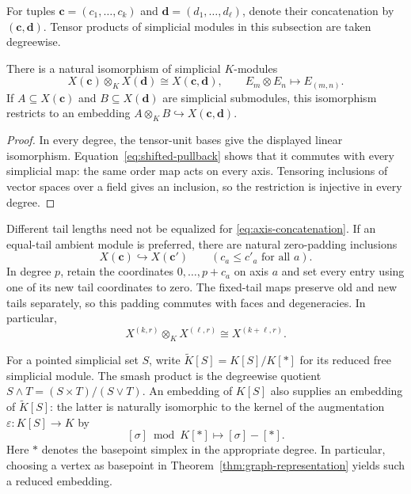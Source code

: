 For tuples $\mathbf c=(c_1,\ldots,c_k)$ and
$\mathbf d=(d_1,\ldots,d_\ell)$, denote their concatenation by
$(\mathbf c,\mathbf d)$. Tensor products of simplicial modules in this
subsection are taken degreewise.

\begin{proposition}
\label{prop:shifted-tensor-product}
There is a natural isomorphism of simplicial $K$-modules
\begin{equation}\label{eq:axis-concatenation}
 X(\mathbf c)\otimes_K X(\mathbf d)
       \cong X(\mathbf c,\mathbf d),\qquad
 E_m\otimes E_n\longmapsto E_{(m,n)}.
\end{equation}
If $A\subseteq X(\mathbf c)$ and $B\subseteq X(\mathbf d)$ are
simplicial submodules, this isomorphism restricts to an embedding
$A\otimes_KB\hookrightarrow X(\mathbf c,\mathbf d)$.
\end{proposition}

\begin{proof}
In every degree, the tensor-unit bases give the displayed linear
isomorphism. Equation~\eqref{eq:shifted-pullback} shows that it commutes
with every simplicial map: the same order map acts on every axis.
Tensoring inclusions of vector spaces over a field gives an inclusion,
so the restriction is injective in every degree.
\end{proof}

Different tail lengths need not be equalized for
\eqref{eq:axis-concatenation}. If an equal-tail ambient module is
preferred, there are natural zero-padding inclusions
\[
 X(\mathbf c)\hookrightarrow X(\mathbf c')
 \qquad(c_a\leq c'_a\text{ for all }a).
\]
In degree $p$, retain the coordinates $0,\ldots,p+c_a$ on axis $a$ and
set every entry using one of its new tail coordinates to zero. The
fixed-tail maps preserve old and new tails separately, so this padding
commutes with faces and degeneracies. In particular,
\[
 X^{(k,r)}\otimes_KX^{(\ell,r)}\cong X^{(k+\ell,r)}.
\]

For a pointed simplicial set $S$, write
$\widetilde K[S]=K[S]/K[*]$ for its reduced free simplicial module.
The smash product is the degreewise quotient
$S\wedge T=(S\times T)/(S\vee T)$.
An embedding of $K[S]$ also supplies an embedding of
$\widetilde K[S]$: the latter is naturally isomorphic to the kernel of
the augmentation $\varepsilon:K[S]\to K$ by
\[
 [\sigma]\bmod K[*]\longmapsto[\sigma]-[*].
\]
Here $*$ denotes the basepoint simplex in the appropriate degree.
In particular, choosing a vertex as basepoint in
Theorem~\ref{thm:graph-representation} yields such a reduced embedding.

